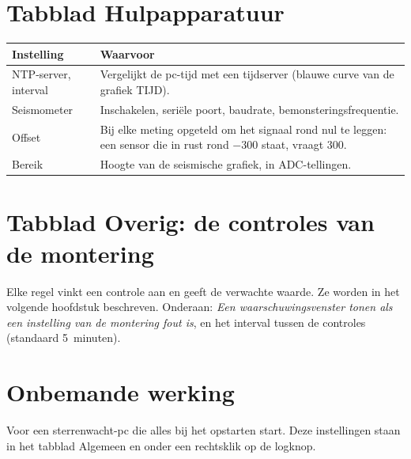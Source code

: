 \needspace{0.6\textheight}
\section{Tabblad Hulpapparatuur}


\begin{center}
\begin{tabularx}{\textwidth}{lX}
\toprule
\textbf{Instelling} & \textbf{Waarvoor} \\
\midrule
NTP-server, interval & Vergelijkt de pc-tijd met een tijdserver (blauwe curve
van de grafiek TIJD). \\
Seismometer & Inschakelen, seriële poort, baudrate,
bemonsteringsfrequentie. \\
Offset & Bij elke meting opgeteld om het signaal rond nul te leggen: een sensor
die in rust rond $-300$ staat, vraagt 300. \\
Bereik & Hoogte van de seismische grafiek, in ADC-tellingen. \\
\bottomrule
\end{tabularx}
\end{center}

\needspace{0.6\textheight}
\section{Tabblad Overig: de controles van de montering}


Elke regel vinkt een controle aan en geeft de verwachte waarde. Ze worden in het
volgende hoofdstuk beschreven. Onderaan: \emph{Een waarschuwingsvenster tonen als
een instelling van de montering fout is}, en het interval tussen de controles
(standaard 5~minuten).

\section{Onbemande werking}
\label{sec:unattended}

Voor een sterrenwacht-pc die alles bij het opstarten start. Deze instellingen
staan in het tabblad Algemeen en onder een rechtsklik op de logknop.

